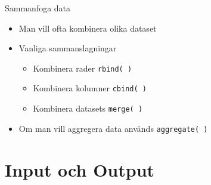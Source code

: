 \documentclass[
  11pt,
  ignorenonframetext,
]{beamer}
\providecommand{\tightlist}{%
  \setlength{\itemsep}{0pt}\setlength{\parskip}{0pt}}
\begin{document}
\begin{frame}{Sammanfoga data}
\protect\hypertarget{sammanfoga-data}{}
\begin{itemize}
\tightlist
\item
  Man vill ofta kombinera olika dataset
\item
  Vanliga sammanslagningar

  \begin{itemize}
  \tightlist
  \item
    Kombinera rader \texttt{rbind( )}
  \item
    Kombinera kolumner \texttt{cbind( )}
  \item
    Kombinera datasets \texttt{merge( )}
  \end{itemize}
\item
  Om man vill aggregera data används \texttt{aggregate( )}
\end{itemize}
\end{frame}

\hypertarget{input-och-output}{%
\section{Input och Output}\label{input-och-output}}
\end{document}
